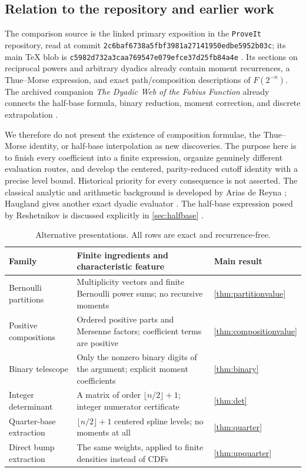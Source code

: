 \documentclass[11pt,oneside]{article}
\theoremstyle{definition}\newtheorem{definition}[theorem]{Definition}
\theoremstyle{remark}\newtheorem{remark}[theorem]{Remark}
\begin{document}
\subsection{Relation to the repository and earlier work}
The comparison source is the linked primary exposition in the \texttt{ProveIt}
repository, read at commit
\nolinkurl{2c6baf6738a5fbf3981a27141950edbe5952b03c}; its main TeX blob is
\nolinkurl{c5982d732a3caa769547e079efce37d25fb84a4e} \cite{repo}.
Its sections on reciprocal powers and arbitrary dyadics already contain moment
recurrences, a Thue--Morse expression, and exact path/composition descriptions
of $F(2^{-n})$. The archived companion \emph{The Dyadic Web of the Fabius
Function} already connects the half-base formula, binary reduction, moment
correction, and discrete extrapolation \cite{webcompanion}.

We therefore do not present the existence of composition formulae, the
Thue--Morse identity, or half-base interpolation as new discoveries.
The purpose here is to finish every coefficient into a finite expression,
organize genuinely different evaluation routes, and develop the centered,
parity-reduced cutoff identity with a precise level bound. Historical priority
for every consequence is not asserted. The classical analytic and arithmetic
background is developed by Arias de Reyna \cite{arias1982,arias2018};
Haugland gives another exact dyadic evaluator \cite{haugland}.
The half-base expression posed by Reshetnikov is discussed explicitly in
\cref{sec:halfbase} \cite{reshetnikov2019}.

\begin{table}[htbp]
\centering\small
\begin{tabularx}{\textwidth}{@{}p{}Xp{}@{}}
\toprule
Family & Finite ingredients and characteristic feature & Main result\\
\midrule
Bernoulli partitions & Multiplicity vectors and finite Bernoulli power sums; no recursive moments & \cref{thm:partitionvalue}\\
Positive compositions & Ordered positive parts and Mersenne factors; coefficient terms are positive & \cref{thm:compositionvalue}\\
Binary telescope & Only the nonzero binary digits of the argument; explicit moment coefficients & \cref{thm:binary}\\
Integer determinant & A matrix of order $\lfloor n/2\rfloor+1$; integer numerator certificate & \cref{thm:det}\\
Quarter-base extraction & $\lfloor n/2\rfloor+1$ centered spline levels; no moments at all & \cref{thm:quarter}\\
Direct bump extraction & The same weights, applied to finite densities instead of CDFs & \cref{thm:upquarter}\\
\bottomrule
\end{tabularx}
\caption{Alternative presentations. All rows are exact and recurrence-free.}
\label{tab:map}
\end{table}
\end{document}
